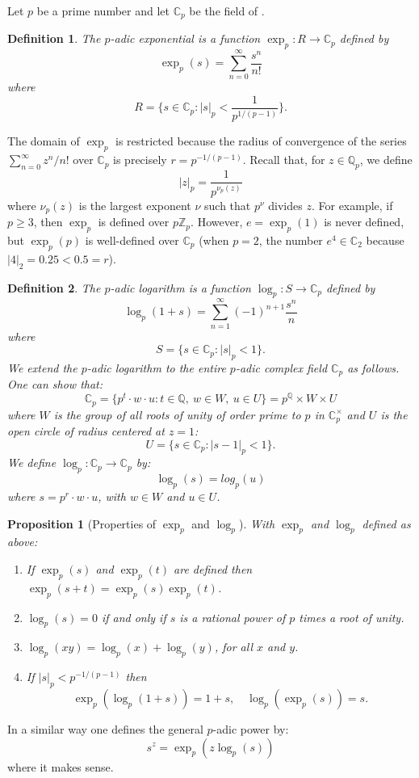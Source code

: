 \documentclass[12pt]{article}
\newtheorem{defn}{Definition}
\newtheorem*{prop}{Proposition}
\theoremstyle{definition}
\newcommand{\Ints}{\mathbb{Z}}
\newcommand{\Complex}{\mathbb{C}}
\newcommand{\Rats}{\mathbb{Q}}
\begin{document}
Let $p$ be a prime number and let $\Complex_p$ be the field of .

\begin{defn}
The $p$-adic exponential is a function $\exp_p\colon R \to \Complex_p$ defined by
$$\exp_p(s)=\sum_{n=0}^\infty \frac{s^n}{n!}$$
where $$R=\{ s\in \Complex_p : |s|_p<\frac{1}{p^{1/(p-1)}}\}.$$ 
\end{defn}

The domain of $\exp_p$ is restricted because the radius of convergence of the series $\sum_{n=0}^\infty z^n/n!$ over $\Complex_p$ is precisely $r=p^{-1/(p-1)}$. Recall that, for $z\in \Rats_p$, we define 
$$|z|_p=\frac{1}{p^{\nu_p(z)}}$$
where $\nu_p(z)$ is the largest exponent $\nu$ such that $p^\nu$ divides $z$. For example, if $p\geq 3$, then $\exp_p$ is defined over $p\Ints_p$. However, $e=\exp_p(1)$ is never defined, but $\exp_p(p)$ is well-defined over $\Complex_p$ (when $p=2$, the number $e^4\in \Complex_2$ because $|4|_2=0.25<0.5=r$).

\begin{defn}
The $p$-adic logarithm is a function $\log_p\colon S\to \Complex_p$ defined by
$$\log_p(1+s)=\sum_{n=1}^\infty (-1)^{n+1}\frac{s^n}{n}$$
where
$$S=\{ s\in \Complex_p : |s|_p<1\}.$$
We extend the $p$-adic logarithm to the entire $p$-adic complex field $\Complex_p$ as follows. One can show that:
$$\Complex_p=\{ p^t\cdot w\cdot u: t\in \Rats,\ w\in W,\ u\in U\}=p^{\Rats}\times W \times U$$
where $W$ is the group of all roots of unity of order prime to $p$ in $\Complex_p^\times$ and $U$ is the open circle of radius centered at $z=1$:
$$U=\{ s\in \Complex_p : |s-1|_p < 1\}.$$
We define $\log_p\colon \Complex_p \to \Complex_p$ by:
$$\log_p(s)=log_p(u)$$
where $s=p^r\cdot w \cdot u$, with $w\in W$ and $u\in U$.
\end{defn}

\begin{prop}[Properties of $\exp_p$ and $\log_p$]
With $\exp_p$ and $\log_p$ defined as above:
\begin{enumerate}
\item If $\exp_p(s)$ and $\exp_p(t)$ are defined then $\exp_p(s+t)=\exp_p(s)\exp_p(t)$.
\item $\log_p(s)=0$ if and only if $s$ is a rational power of $p$ times a root of unity.
\item $\log_p(xy)=\log_p(x)+\log_p(y)$, for all $x$ and $y$.
\item If $|s|_p<p^{-1/(p-1)}$ then 
$$\exp_p(\log_p(1+s))=1+s,\quad \log_p(\exp_p(s))=s.$$
\end{enumerate}

\end{prop}

In a similar way one defines the general $p$-adic power by:
$$s^z=\exp_p(z\log_p(s))$$
where it makes sense.
\end{document}
